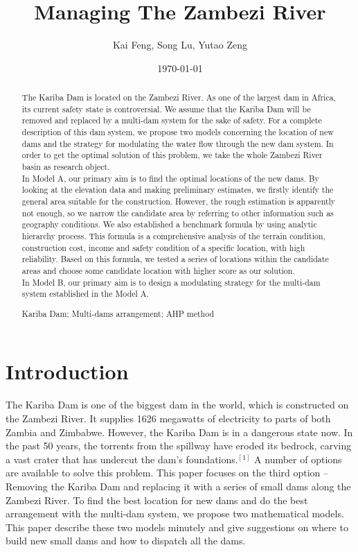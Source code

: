 \documentclass{mcmthesis}
\title{Managing The Zambezi River}
\author{Kai Feng, Song Lu, Yutao Zeng}
\date{\today}
\begin{document}
\begin{abstract}
The Kariba Dam is located on the Zambezi River. As one of the largest dam in Africa, its current safety state is controversial. We assume that the Kariba Dam will be removed and replaced by a multi-dam system for the sake of safety. For a complete description of this dam system, we propose two models concerning the location of new dams and the strategy for modulating the water flow through the new dam system. In order to get the optimal solution of this problem, we take the whole Zambezi River basin as research object.\\
\indent In Model A, our primary aim is to find the optimal locations of the new dams. By looking at the elevation data and making preliminary estimates, we firstly identify the general area suitable for the construction. However, the rough estimation is apparently not enough, so we narrow the candidate area by referring to other information such as geography conditions. We also established a benchmark formula by using analytic hierarchy process. This formula is a comprehensive analysis of the terrain condition, construction cost, income and safety condition of a specific location, with high reliability. Based on this formula, we tested a series of locations within the candidate areas and choose some candidate location with higher score as our solution.\\
\indent In Model B, our primary aim is to design a modulating strategy for the multi-dam system established in the Model A.
\begin{keywords}
Kariba Dam; Multi-dams arrangement; AHP method
\end{keywords}
\end{abstract}
\maketitle
\section{Introduction}
\indent \indent The Kariba Dam is one of the biggest dam in the world, which is constructed on the Zambezi River. It supplies 1626 megawatts of electricity to parts of both Zambia and Zimbabwe. However, the Kariba Dam is in a dangerous state now. In the past 50 years, the torrents from the spillway have eroded its bedrock, carving a vast crater that has undercut the dam's foundations.$^{[1]}$ A number of options are available to solve this problem. This paper focuses on the third option -- Removing the Kariba Dam and replacing it with a series of small dams along the Zambezi River. To find the best location for new dams and do the best arrangement with the multi-dam system, we propose two mathematical models. This paper describe these two models minutely and give suggestions on where to build new small dams and how to dispatch all the dams. \\
\end{document}
